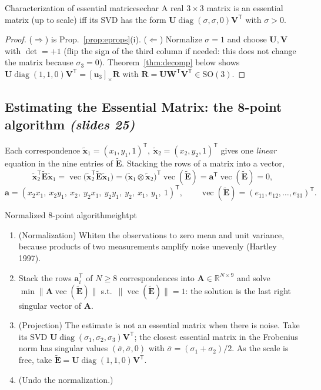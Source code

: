 \documentclass[11pt,a4paper]{article}
\newcommand{\slr}[1]{\texorpdfstring{\emph{(slides #1)}}{(slides #1)}}
\newcommand{\R}{\mathbb{R}}
\newcommand{\SO}{\mathrm{SO}(3)}
\newcommand{\xt}{\tilde{\bm{x}}}    %
\newcommand{\E}{\tilde{\bm E}}
\newcommand{\sk}[1]{[#1]_{\times}}
\newcommand{\norm}[1]{\lVert #1\rVert}
\newcommand{\tr}{^{\mathsf T}}
\DeclareMathOperator{\diag}{diag}
\DeclareMathOperator{\vecop}{vec}
\begin{document}
\begin{theorem}{Characterization of essential matrices}{echar}
A real $3\times3$ matrix is an essential matrix (up to scale) iff its SVD has the form $\bm U\diag(\sigma,\sigma,0)\bm V\tr$ with $\sigma>0$.
\end{theorem}
\begin{proof}
($\Rightarrow$) is Prop.~\ref{prop:eprops}(i). ($\Leftarrow$) Normalize $\sigma=1$ and choose $\bm U,\bm V$ with $\det=+1$ (flip the sign of the third column if needed: this does not change the
matrix because $\sigma_3=0$). Theorem~\ref{thm:decomp} below shows $\bm U\diag(1,1,0)\bm V\tr=\sk{\bm u_3}\bm R$ with $\bm R=\bm U\bm W\tr\bm V\tr\in\SO$.
\end{proof}

\subsection{Estimating the Essential Matrix: the 8-point algorithm \slr{25}}
Each correspondence $\xt_1=(x_1,y_1,1)\tr,\ \xt_2=(x_2,y_2,1)\tr$ gives one \emph{linear} equation in the nine entries of $\E$. Stacking the rows of a matrix into a vector,
\[
\xt_2\tr\E\xt_1=\vecop\bigl(\xt_2\tr\E\xt_1\bigr)=\bigl(\xt_1\otimes\xt_2\bigr)\tr\vecop(\E)=\bm a\tr\vecop(\E)=0,
\]
\[
\bm a=(x_2x_1,\ x_2y_1,\ x_2,\ y_2x_1,\ y_2y_1,\ y_2,\ x_1,\ y_1,\ 1)\tr,\qquad \vecop(\E)=(e_{11},e_{12},\dots,e_{33})\tr .
\]

\begin{algorithm}{Normalized 8-point algorithm}{eightpt}
\begin{enumerate}[nosep]
\item (Normalization) Whiten the observations to zero mean and unit variance, because products of two measurements amplify noise unevenly (Hartley 1997).
\item Stack the rows $\bm a_i\tr$ of $N\ge8$ correspondences into $\bm A\in\R^{N\times9}$ and solve $\min\norm{\bm A\vecop(\E)}$ s.t.\ $\norm{\vecop(\E)}=1$:
 the solution is the last right singular vector of $\bm A$.
\item (Projection) The estimate is not an essential matrix when there is noise. Take its SVD $\bm U\diag(\sigma_1,\sigma_2,\sigma_3)\bm V\tr$; the closest essential matrix in the Frobenius norm has singular values $(\bar\sigma,\bar\sigma,0)$ with $\bar\sigma=(\sigma_1+\sigma_2)/2$.
 As the scale is free, take $\E=\bm U\diag(1,1,0)\bm V\tr$.
\item (Undo the normalization.)
\end{enumerate}
\end{algorithm}
\end{document}
